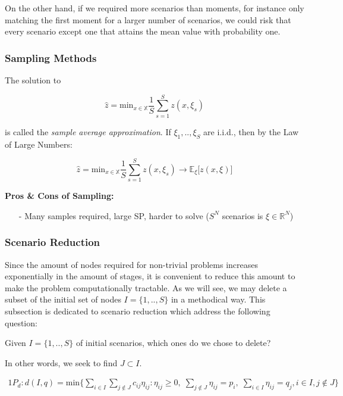 On the other hand, if we required more scenarios than moments, for instance
only matching the first moment for a larger number of scenarios, we could risk 
that every scenario except one that attains the mean value with probability one.

\subsubsection{Sampling Methods}

The solution to

\[
\hat{z} = \textrm{min}_{x \in \mathbb{X}} \frac{1}{S}\sum_{s=1}^S z(x,\xi_s)
\]

is called the \emph{sample average approximation}. If $\xi_1,..,\xi_S$ are i.i.d.,
then by the Law of Large Numbers:

\[
\hat{z} = \textrm{min}_{x\in \mathbb{X}} \frac{1}{S}\sum_{s=1}^S z(x,\xi_s) \rightarrow \mathbb{E}_\xi \big[z(x,\xi)\big]
\]

{\large\bf Pros \& Cons of Sampling:}
\begin{itemize}
\item[-] Many samples required, large SP, harder to solve ($S^N$ scenarios is $\xi \in \mathbb{R}^N$)
\end{itemize}

\subsubsection{Scenario Reduction}

Since the amount of nodes required for non-trivial problems increases exponentially
in the amount of stages, it is convenient to reduce this amount to make the problem
computationally tractable. As we will see, we may delete a subset of the initial set
of nodes $I = \{1, .., S\}$ in a methodical way. This subsection is dedicated to scenario
reduction which address the following question:\\

\begin{center}
Given $I = \{1, .., S\}$ of initial scenarios, which ones do we chose to delete?
\end{center}

In other words, we seek to find $J \subset I$.


\begin{alignat}{1}
P_d: d(I, q) = \text{min} \Big\{\sum_{i\in I} \sum_{j\notin J} c_{ij} \eta_{ij} : \eta_{ij} \geq 0, \;\sum_{j\notin J} \eta_{ij} = p_i, \;\sum_{i\in I} \eta_{ij} = q_j, i \in I, j \notin J \Big\}
\label{eq:distanceprimal}
\end{alignat}


